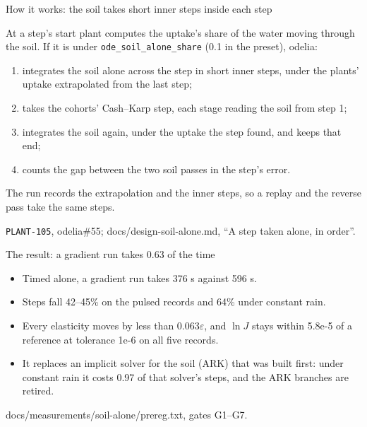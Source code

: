 \documentclass[aspectratio=169,10pt]{beamer}
\newcommand{\src}[1]{\par\vfill{\tiny\color{quiet} #1}}
\begin{document}
\begin{frame}{How it works: the soil takes short inner steps inside each step}
  \begin{center}
  \end{center}
  \small
  At a step's start plant computes the uptake's share of the water moving through the soil. If
  it is under \texttt{ode\_soil\_alone\_share} (0.1 in the preset), odelia:
  \begin{enumerate}
    \item integrates the soil alone across the step in short inner steps, under the plants'
      uptake extrapolated from the last step;
    \item takes the cohorts' Cash--Karp step, each stage reading the soil from step 1;
    \item integrates the soil again, under the uptake the step found, and keeps that end;
    \item counts the gap between the two soil passes in the step's error.
  \end{enumerate}
  The run records the extrapolation and the inner steps, so a replay and the reverse pass take
  the same steps.
  \src{\texttt{PLANT-105}, odelia\#55; docs/design-soil-alone.md, ``A step taken alone, in order''.}
\end{frame}

\begin{frame}{The result: a gradient run takes 0.63 of the time}
  \small
  \begin{itemize}
    \item Timed alone, a gradient run takes 376 s against 596 s.
    \item Steps fall 42--45\% on the pulsed records and 64\% under constant rain.
    \item Every elasticity moves by less than 0.063$\varepsilon$, and $\ln J$ stays within
      5.8e-5 of a reference at tolerance 1e-6 on all five records.
    \item It replaces an implicit solver for the soil (ARK) that was built first: under constant
      rain it costs 0.97 of that solver's steps, and the ARK branches are retired.
  \end{itemize}
  \src{docs/measurements/soil-alone/prereg.txt, gates G1--G7.}
\end{frame}
\end{document}
